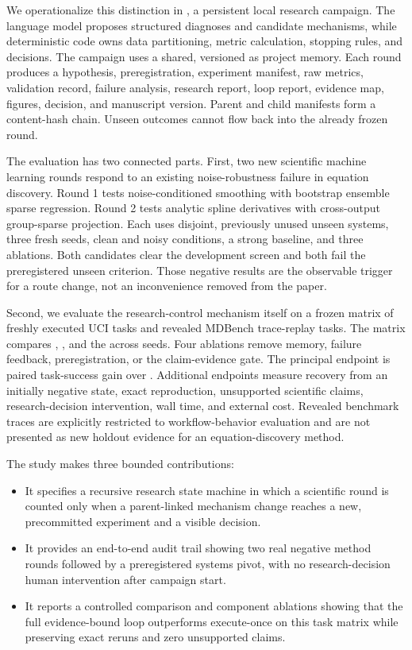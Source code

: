 We operationalize this distinction in \method{}, a persistent local research
campaign. The language model proposes structured diagnoses and candidate
mechanisms, while deterministic code owns data partitioning, metric
calculation, stopping rules, and decisions. The campaign uses a shared,
versioned \vault{} as project memory. Each round produces a hypothesis,
preregistration, experiment manifest, raw metrics, validation record, failure
analysis, research report, loop report, evidence map, figures, decision, and
manuscript version. Parent and child manifests form a content-hash chain.
Unseen outcomes cannot flow back into the already frozen round.

The evaluation has two connected parts. First, two new scientific machine
learning rounds respond to an existing noise-robustness failure in equation
discovery. Round 1 tests noise-conditioned smoothing with bootstrap ensemble
sparse regression. Round 2 tests analytic spline derivatives with
cross-output group-sparse projection. Each uses disjoint, previously unused
unseen systems, three fresh seeds, clean and noisy conditions, a strong
baseline, and three ablations. Both candidates clear the development screen
and both fail the preregistered unseen criterion. Those negative results are
the observable trigger for a route change, not an inconvenience removed from
the paper.

Second, we evaluate the research-control mechanism itself on a frozen matrix
of \UciTaskCount{} freshly executed UCI tasks and \MDBenchTaskCount{} revealed
MDBench trace-replay tasks. The matrix compares \oneshot{}, \executeonce{},
and the \systemloop{} across \SeedCount{} seeds. Four ablations remove
\vault{} memory, failure feedback, preregistration, or the claim-evidence
gate. The principal endpoint is paired task-success gain over \executeonce{}.
Additional endpoints measure recovery from an initially negative state, exact
reproduction, unsupported scientific claims, research-decision intervention,
wall time, and external cost. Revealed benchmark traces are explicitly
restricted to workflow-behavior evaluation and are not presented as new
holdout evidence for an equation-discovery method.

The study makes three bounded contributions:

\begin{itemize}
  \item It specifies a recursive research state machine in which a scientific
  round is counted only when a parent-linked mechanism change reaches a new,
  precommitted experiment and a visible decision.
  \item It provides an end-to-end audit trail showing two real negative
  method rounds followed by a preregistered systems pivot, with no
  research-decision human intervention after campaign start.
  \item It reports a controlled comparison and component ablations showing
  that the full evidence-bound loop outperforms execute-once on this task
  matrix while preserving exact reruns and zero unsupported claims.
\end{itemize}


